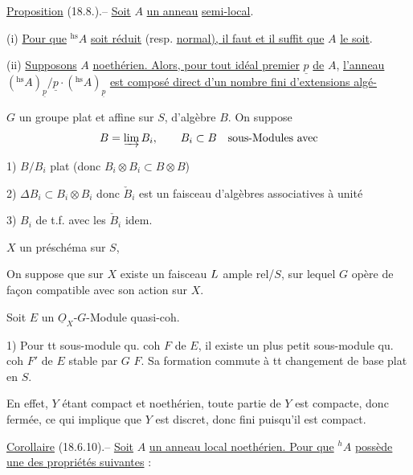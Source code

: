 \uline{Proposition} (18.8.).-- \uline{Soit} $A$ \uline{un anneau}  \uline{semi-local}.

(i) \uline{Pour que} ${}^{\mathrm{hs}}A$ \uline{soit réduit} (resp. \uline{normal), il faut et il suffit que} $A$ \uline{le soit}.

(ii) \uline{Supposons} $A$ \uline{noethérien. Alors, pour tout idéal premier} $\underline p$ \uline{de} $A$, \uline{l'anneau} $({}^{\mathrm{hs}}A)_{\underline p}/\underline p\cdot({}^{\mathrm{hs}}A)_{\underline p}$ \uline{est composé direct d'un nombre fini d'extensions algé-}


$G$ un groupe plat et affine sur $S$, d'algèbre $B$. On suppose
\[
B=\varinjlim B_i,\qquad B_i\subset B\quad\text{sous-Modules avec}
\]

1) $B/B_i$ plat (donc $B_i\otimes B_i\subset B\otimes B$)

2) $\Delta B_i\subset B_i\otimes B_i$ donc $\check B_i$ est un faisceau d'algèbres associatives à unité

3) $B_i$   de t.f. avec les $\check B_i$ idem.

$X$ un préschéma sur $S$,  

 On suppose que sur $X$ existe un faisceau  $L$ ample rel/$S$, sur lequel $G$ opère de façon compatible avec son action sur $X$.

Soit $E$ un $\underline O_X$-$G$-Module quasi-coh. 

1) Pour tt sous-module qu. coh $F$ de $E$, il existe un plus petit sous-module qu. coh $F'$ de $E$  stable par $G$  $F$. Sa  formation commute à tt changement de base plat en $S$.



En effet, $Y$ étant compact  et noethérien, toute partie de $Y$ est compacte, donc fermée, ce qui implique que $Y$ est discret, donc fini puisqu'il est compact.

\uline{Corollaire} (18.6.10).-- \uline{Soit} $A$ \uline{un anneau local noethérien. Pour que} ${}^h A$ \uline{possède une des propriétés suivantes} :

